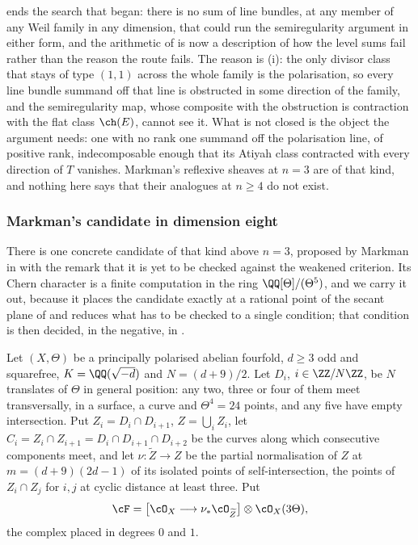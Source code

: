 \begin{remark}\label{rem:nolinemeaning}
 ends the search that  began: there is no
sum of line bundles, at any member of any Weil family in any dimension, that
could run the semiregularity argument in either form, and the arithmetic of
 is now a description of how the level sums fail rather
than the reason the route fails. The reason is (i): the
only divisor class that stays of type $(1,1)$ across the whole family is the
polarisation, so every line bundle summand off that line is obstructed in
some direction of the family, and the semiregularity map, whose composite
with the obstruction is contraction with the flat class $\ch(E)$, cannot see
it. What is not closed is the object the argument needs: one with no rank one
summand off the polarisation line, of positive rank, indecomposable enough
that its Atiyah class contracted with every direction of $T$ vanishes.
Markman's reflexive sheaves at $n=3$ are of that kind, and nothing here
says that their analogues at $n\ge4$ do not exist.
\end{remark}

\subsubsection*{Markman's candidate in dimension eight}

There is one concrete candidate of that kind above $n=3$, proposed by Markman
in \cite[Section 12]{Mar25b} with the remark that it is yet to be checked
against the weakened criterion. Its Chern character is a finite computation
in the ring $\QQ[\Theta]/(\Theta^{5})$, and we carry it out, because it
places the candidate exactly at a rational point of the secant plane of
 and reduces what has to be checked to a single
condition; that condition is then decided, in the negative, in
.

\begin{setupenv}\label{setup:markman}
Let $(X,\Theta)$ be a principally polarised abelian fourfold, $d\ge3$ odd and
squarefree, $K=\QQ(\sqrt{-d})$ and $N=(d+9)/2$. Let $D_{i}$, $i\in\ZZ/N\ZZ$,
be $N$ translates of $\Theta$ in general position: any two, three or four of
them meet transversally, in a surface, a curve and $\Theta^{4}=24$ points,
and any five have empty intersection. Put $Z_{i}=D_{i}\cap D_{i+1}$,
$Z=\bigcup_{i}Z_{i}$, let $C_{i}=Z_{i}\cap Z_{i+1}=D_{i}\cap D_{i+1}\cap D_{i+2}$
be the curves along which consecutive components meet, and let
$\nu\colon\widetilde{Z}\to Z$ be the partial normalisation of $Z$ at
$m=(d+9)(2d-1)$ of its isolated points of self-intersection, the points of
$Z_{i}\cap Z_{j}$ for $i,j$ at cyclic distance at least three. Put
\[
  \cF=\bigl[\cO_{X}\longrightarrow\nu_{*}\cO_{\widetilde{Z}}\bigr]\otimes\cO_{X}(3\Theta),
\]
the complex placed in degrees $0$ and $1$.
\end{setupenv}

